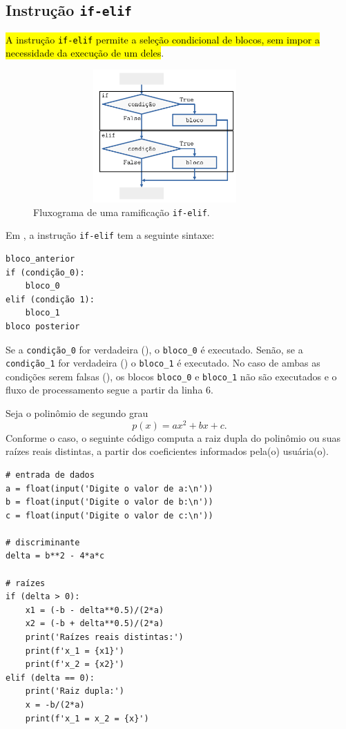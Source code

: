 \subsection{Instrução \texttt{if-elif}}

\hl{A instrução \texttt{if-elif} permite a seleção condicional de blocos, sem impor a necessidade da execução de um deles}.

\begin{figure}[H]
  \centering
  \includegraphics[max width=0.9\textwidth, max height=2in]{./cap_progest/dados/fig_fg_elif/fig.png}
  \caption{Fluxograma de uma ramificação \lstinline+if-elif+.}
  \label{cap_progest_sec_ramifica:fig:fg_elif}
\end{figure}

Em {\python}, a instrução \lstinline+if-elif+ tem a seguinte sintaxe:

\begin{lstlisting}
bloco_anterior
if (condição_0):
    bloco_0
elif (condição 1):
    bloco_1
bloco posterior
\end{lstlisting}

Se a \lstinline+condição_0+ for verdadeira ({\PYTHONTrue}), o \lstinline+bloco_0+ é executado. Senão, se a \lstinline+condição_1+ for verdadeira ({\PYTHONTrue}) o \lstinline+bloco_1+ é executado. No caso de ambas as condições serem falsas ({\PYTHONFalse}), os blocos \lstinline+bloco_0+ e \lstinline+bloco_1+ não são executados e o fluxo de processamento segue a partir da linha 6.

\begin{ex}
  Seja o polinômio de segundo grau
  \begin{equation}
    p(x) = ax^2 + bx + c.
  \end{equation}
  Conforme o caso, o seguinte código computa a raiz dupla do polinômio ou suas raízes reais distintas, a partir dos coeficientes informados pela(o) usuária(o).

\begin{lstlisting}
# entrada de dados
a = float(input('Digite o valor de a:\n'))
b = float(input('Digite o valor de b:\n'))
c = float(input('Digite o valor de c:\n'))

# discriminante
delta = b**2 - 4*a*c

# raízes
if (delta > 0):
    x1 = (-b - delta**0.5)/(2*a)
    x2 = (-b + delta**0.5)/(2*a)
    print('Raízes reais distintas:')
    print(f'x_1 = {x1}')
    print(f'x_2 = {x2}')
elif (delta == 0):
    print('Raiz dupla:')
    x = -b/(2*a)
    print(f'x_1 = x_2 = {x}')
\end{lstlisting}

\end{ex}

